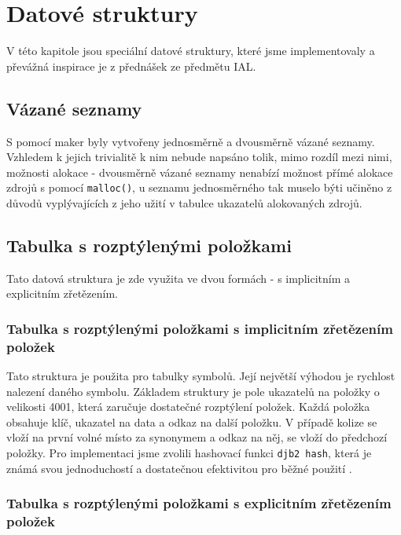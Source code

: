 \documentclass[a4paper, 11pt]{article}
\begin{document}
\section{Datové struktury}

V této kapitole jsou speciální datové struktury, které jsme implementovaly a převážná inspirace je z přednášek ze předmětu IAL.

\subsection{Vázané seznamy} \label{SLL a DLL}
S pomocí maker byly vytvořeny jednosměrně a dvousměrně vázané seznamy. 
Vzhledem k jejich trivialitě k nim nebude napsáno tolik, mimo rozdíl mezi nimi, možnosti alokace - dvousměrně vázané seznamy nenabízí možnost přímé alokace zdrojů s pomocí \verb|malloc()|, u seznamu jednosměrného tak muselo býti učiněno z důvodů vyplývajících z jeho užití v tabulce ukazatelů alokovaných zdrojů.

\subsection{Tabulka s rozptýlenými položkami} \label{TRP}
Tato datová struktura je zde využita ve dvou formách \-- s implicitním a explicitním zřetězením.

\subsubsection{Tabulka s rozptýlenými položkami s implicitním zřetězením položek}
Tato struktura je použita pro tabulky symbolů. 
Její největší výhodou je rychlost nalezení daného symbolu.
Základem struktury je pole ukazatelů na položky o velikosti 4001, která zaručuje dostatečné rozptýlení položek.
Každá položka obsahuje klíč, ukazatel na data a odkaz na další položku.
V případě kolize se vloží na první volné místo za synonymem a odkaz na něj, se vloží do předchozí položky.
Pro implementaci jsme zvolili hashovací funkci \verb|djb2 hash|, která je známá svou jednoduchostí a dostatečnou efektivitou pro běžné použití \cite{el-hash}.

\subsubsection{Tabulka s rozptýlenými položkami s explicitním zřetězením položek}
\end{document}

